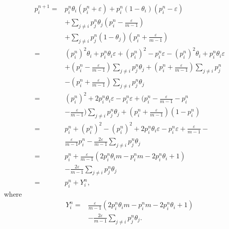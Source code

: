 \documentclass[10pt,journal,cspaper,compsoc,onecolumn]{IEEEtran}
\begin{document}
\begin{equation}
    \label{eq:7}
    \begin{split}
    p_i^{n + 1} = &p_i^n\theta_i(p_i^n + \varepsilon) + p_i^n(1-\theta_i)(p_i^n - \varepsilon)\\
    &+ \sum_{j \neq i}p_j^n\theta_j(p_i^n - \displaystyle \frac{\varepsilon}{m- 1})\\
    &+ \sum_{j \neq i}p_j^n(1 - \theta_j)(p_i^n + \displaystyle\frac{\varepsilon}{m - 1})\\
    =&(p_i^n)^2\theta_i + p_i^n\theta_i\varepsilon + (p_i^n)^2 - p_i^n\varepsilon - (p_i^n)^2\theta_i + p_i^n\theta_i\varepsilon\\
    & + (p_i^n - \displaystyle\frac{\varepsilon}{m - 1})\sum_{j \neq i}p_j^n\theta_j + (p_i^n + \displaystyle\frac{\varepsilon}{m - 1})\sum_{j \neq i}p_j^n\\
    &- (p_i^n + \displaystyle\frac{\varepsilon}{m - 1})\sum_{j \neq i}p_j^n\theta_j\\
    =&(p_i^n)^2 + 2p_i^n\theta_i\varepsilon - p_i^n\varepsilon + (p_i^n - \displaystyle\frac{\varepsilon}{m - 1} - p_i^n \\
    &- \displaystyle\frac{\varepsilon}{m - 1})\sum_{j \neq i}p_j^n\theta_j + (p_i^n + \displaystyle\frac{\varepsilon}{m - 1})(1 - p_i^n)\\
    =&p_i^n + (p_i^n)^2 - (p_i^n)^2 + 2p_i^n\theta_i\varepsilon - p_i^n\varepsilon + \displaystyle\frac{\varepsilon}{m - 1} - \\
    &\displaystyle\frac{\varepsilon}{m - 1}p_i^n - \displaystyle\frac{2\varepsilon}{m - 1}\sum_{j \neq i}p_j^n\theta_j\\
    =&p_i^n + \displaystyle\frac{\varepsilon}{m - 1}(2p_i^n\theta_im - p_i^nm - 2p_i^n\theta_i + 1 )\\
    &- \displaystyle\frac{2\varepsilon}{m-1}\sum_{j \neq i}p_j^n\theta_j\\
    =&p_i^n + Y_i^n,
    \end{split}
\end{equation}
where
\begin{equation}
    \begin{split}
    \label{eq:yi}
    Y_i^n = &\displaystyle\frac{\varepsilon}{m - 1}(2p_i^n\theta_im - p_i^nm - 2p_i^n\theta_i + 1 )\\
             &- \displaystyle\frac{2\varepsilon}{m-1}\sum_{j \neq i}p_j^n\theta_j.
    \end{split}
 \end{equation}
\end{document}
